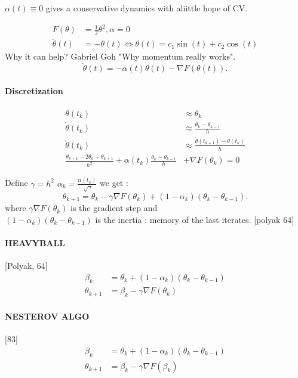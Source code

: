 \begin{note}
    $ \alpha (t) \equiv 0 $  gives a conservative dynamics with aliittle hope of CV.

    \begin{align*}
        F(\theta ) &= \frac{1}{2}\theta ^2, \alpha = 0 \\
        \ddot{\theta }(t) &= - \theta (t) \Leftrightarrow \theta (t) = c_1 \sin (t) + c_2 \cos (t)
    \end{align*}
    Why it can help? Gabriel Goh "Why momentum really works".
    \[
        \ddot{\theta }(t) = - \alpha (t) \dot{\theta }(t) - \nabla F(\theta (t))
    .\]
    
    \paragraph*{Discretization }
    \begin{align*}
        \theta (t_k) & \approx \theta _k \\
        \dot{\theta } (t_k) & \approx \frac{\theta _k - \theta _{k-1}}{h} \\
        \ddot{\theta } (t_k) & \approx \frac{\dot{\theta }(t_{k+1}) - \dot{\theta }(t_k)}{h} \\
        \frac{\theta _{k+1} - 2 \theta _{k} + \theta _{k+1}}{h^2} + \alpha (t_k) \frac{\theta _{k}- \theta _{k-1} }{h} &+ \nabla F(\theta _{k}) = 0
    \end{align*}
    
    Define $\gamma = h^2$  $\alpha_k = \frac{\alpha (t_k)}{\sqrt[]{\gamma }}$ we get :
    \[
        \theta _{k+1} = \theta _{k} - \gamma \nabla F(\theta _{k}) + (1 - \alpha_k )(\theta _{k} - \theta _{k-1})
    .\]
    where $\gamma \nabla F(\theta _{k})$ is the gradient step and \\
    $ (1 - \alpha_k )(\theta _{k} - \theta _{k-1})$ is the inertia : memory of the last iterates. [polyak 64]


    \paragraph*{HEAVYBALL}[Polyak, 64]
    \begin{align*}
        \beta _k &= \theta _k + (1 - \alpha _k) (\theta _k - \theta _{k-1}) \\
        \theta _{k+1} &= \beta _k - \gamma \nabla F(\theta _k)
    \end{align*}

    \paragraph*{NESTEROV ALGO}[83]
    \begin{align*}
        \beta _k &= \theta _k + (1 - \alpha _k) (\theta _k - \theta _{k-1}) \\
        \theta _{k+1} &= \beta _k - \gamma \nabla F(\beta _k)
    \end{align*}


\end{note}
